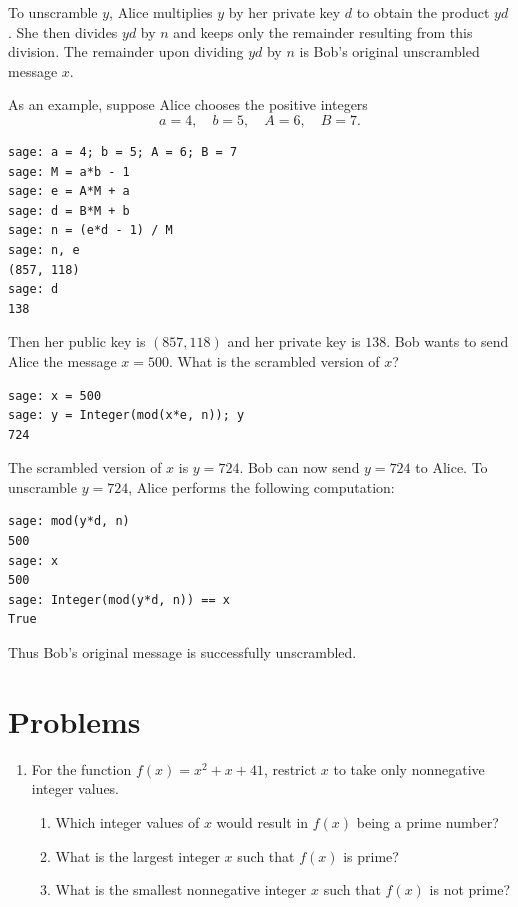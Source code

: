 To unscramble $y$, Alice multiplies $y$ by her private key $d$ to
obtain the product $yd$. She then divides $yd$ by $n$ and keeps only
the remainder resulting from this division. The remainder upon
dividing $yd$ by $n$ is Bob's original unscrambled message $x$.

As an example, suppose Alice chooses the positive integers
\[
a = 4,\quad
b = 5,\quad
A = 6,\quad
B = 7.
\]
%
\begin{lstlisting}
sage: a = 4; b = 5; A = 6; B = 7
sage: M = a*b - 1
sage: e = A*M + a
sage: d = B*M + b
sage: n = (e*d - 1) / M
sage: n, e
(857, 118)
sage: d
138
\end{lstlisting}
%
Then her public key is $(857, 118)$ and her private key is $138$. Bob
wants to send Alice the message $x = 500$. What is the scrambled
version of $x$?
%
\begin{lstlisting}
sage: x = 500
sage: y = Integer(mod(x*e, n)); y
724
\end{lstlisting}
%
The scrambled version of $x$ is $y = 724$. Bob can now send $y = 724$
to Alice. To unscramble $y = 724$, Alice performs the following
computation:
%
\begin{lstlisting}
sage: mod(y*d, n)
500
sage: x
500
sage: Integer(mod(y*d, n)) == x
True
\end{lstlisting}
%
Thus Bob's original message is successfully unscrambled.



\section*{Problems}

\begin{enumerate}
\item For the function $f(x) = x^2 + x + 41$, restrict $x$ to take
  only nonnegative integer values.
  \begin{enumerate}
  \item Which integer values of $x$ would result in $f(x)$ being a
    prime number?

  \item What is the largest integer $x$ such that $f(x)$ is prime?

  \item What is the smallest nonnegative integer $x$ such that $f(x)$
    is not prime?
  \end{enumerate}
\end{enumerate}
